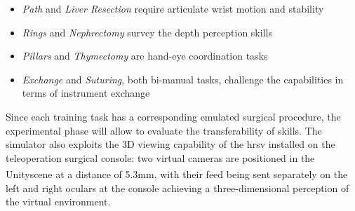 \documentclass{article}
\newcommand{\cright}{\textsuperscript{\textregistered}\phantom{..}}
\begin{document}
\begin{multicols}{2}
\begin{figure}
      \label{fig:taskspanel}
\end{figure}
\begin{itemize}
  \item \textit{Path} and \textit{Liver Resection} require articulate wrist motion and stability
  \item \textit{Rings} and \textit{Nephrectomy} survey the depth perception skills
  \item \textit{Pillars} and \textit{Thymectomy} are hand-eye coordination tasks
  \item \textit{Exchange} and \textit{Suturing}, both bi-manual tasks, challenge the capabilities in terms of instrument exchange 
\end{itemize}
Since each training task has a corresponding emulated surgical procedure, the experimental phase will allow to evaluate the transferability of skills.
\newline
The simulator also exploits the 3D viewing capability of the \ac{hrsv} installed on the teleoperation surgical console: two virtual cameras are positioned in the Unity\cright scene at a distance of 5.3mm, with their feed being sent separately on the left and right oculars at the console achieving a three-dimensional perception of the virtual environment.

\end{multicols}
\end{document}
